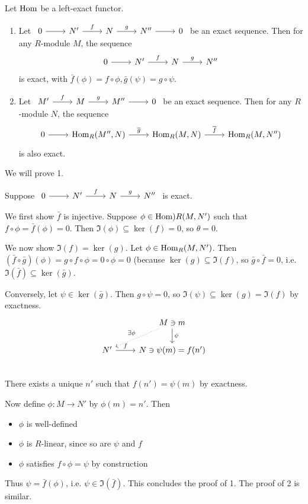 \documentclass[x11names,reqno,14pt]{extarticle}
\begin{document}
\prop

Let ${\mathrm{Hom}}$ be a left-exact functor. 

\begin{enumerate}

\item Let $\exactshort{N'}{f}{N}{g}{N''}$ be an exact sequence. Then for any $R$-module $M$, the sequence
\[
\begin{tikzcd}
0\ar[r]&N'\ar[r, "f"]&N\ar[r, "g"]&N''
\end{tikzcd}
\]
is exact, with $\bar{f}(\phi) = f\circ\phi, \bar{g}(\psi) = g\circ\psi$.

\item Let $\begin{tikzcd} M'\ar[r, "f"]&M\ar[r, "g"]&M''\ar[r]&0 \end{tikzcd}$ be an exact sequence. Then for any $R$-module $N$, the sequence
\[
\begin{tikzcd}
0\ar[r]&\Hom_R(M'', N) \ar[r, "\bar{g}"]&\Hom_R(M, N)\ar[r, "\bar{f}"]&\Hom_R(M, N'')
\end{tikzcd}
\]
is also exact.
\end{enumerate}

\proof

We will prove 1. 

Suppose $\begin{tikzcd}0\ar[r]&N'\ar[r, "f"]&N\ar[r, "g"] & N'' \end{tikzcd}$ is exact. 

We first show $\bar{f}$ is injective. Suppose $\phi\in{\mathrm{Hom}})R(M, N')$ such that $f \circ \phi = \bar{f}(\phi) = 0$. Then $\Im(\phi)\subseteq\ker(f) = 0$, so $\theta=0$. 

We now show $\Im(f) = \ker(g)$. Let $\phi\in{\mathrm{Hom}}_R(M, N')$. Then $(\bar{f}\circ\bar{g})(\phi) = g\circ f \circ \phi = 0 \circ \phi = 0$ (because $\ker(g) \subseteq \Im(f)$, so $\bar{g}\circ\bar{f} = 0$, i.e. $\Im(\bar{f})\subseteq\ker(\bar{g})$. 

Conversely, let $\psi\in\ker(\bar{g})$. Then $g\circ\psi=0$, so $\Im(\psi)\subseteq\ker(g) = \Im(f)$ by exactness. 
\[
\begin{tikzcd}
& \ar[dl, dotted, "\exists \phi"']\ar[d, "\psi"]M\ni m \\
N'\ar[r, "f"]&N \ni \psi(m) = f(n')\\
\end{tikzcd}
\]
There exists a unique $n'$ such that $f(n') = \psi(m)$ by exactness. 

Now define $\phi:M\to N'$ by $\phi(m) = n'$. Then 
\begin{itemize}
\item $\phi$ is well-defined
\item $\phi$ is $R$-linear, since so are $\psi$ and $f$
\item $\phi$ satisfies $f\circ\phi = \psi$ by construction
\end{itemize}
Thus $\psi = \bar{f}(\phi)$, i.e. $\psi\in\Im(\bar{f})$. This concludes the proof of 1. The proof of 2 is similar. 
\end{document}
